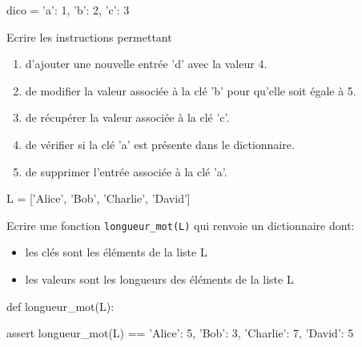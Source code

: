 \documentclass[11pt, a4paper]{report}
\begin{document}
\begin{exercice_cours}{}
    
    \begin{CodePythontexAlt}[Largeur=1\linewidth,Centre,Lignes=false,PremLigne=1]{}
dico = {'a': 1, 'b': 2, 'c': 3}
\end{CodePythontexAlt}

Ecrire les instructions permettant
    \begin{enumerate}
        \item d'ajouter une nouvelle entrée 'd' avec la valeur 4. \hfill{}
        \item de modifier la valeur associée à la clé 'b' pour qu'elle soit égale à 5. \hfill{}
        \item de récupérer la valeur associée à la clé 'c'. \hfill{}
        \item de vérifier si la clé 'a' est présente dans le dictionnaire. \hfill{}
        \item de supprimer l'entrée associée à la clé 'a'. \hfill{}
    \end{enumerate}

\end{exercice_cours}

\begin{exercice_cours}{}
    
\begin{CodePythontexAlt}[Largeur=1\linewidth,Centre,Lignes=false,PremLigne=1]{}
L = ['Alice', 'Bob', 'Charlie', 'David']
\end{CodePythontexAlt}

Ecrire une fonction \verb|longueur_mot(L)| qui renvoie un dictionnaire dont:
\begin{itemize}
    \item les clés sont les éléments de la liste L
    \item les valeurs sont les longueurs des éléments de la liste L
\end{itemize}


        \begin{CodePythontexAlt}[TaillePolice=\large, Largeur=1\linewidth,Centre,Lignes=false]{}
    def longueur_mot(L):
        
    





    assert longueur_mot(L) == {'Alice': 5, 'Bob': 3, 'Charlie': 7, 'David': 5}
        \end{CodePythontexAlt}


       
\end{exercice_cours}
\end{document}
